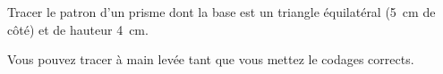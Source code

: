 
\begin{exercice}\label{exo2smath-0319}

    Tracer le patron d'un prisme dont la base est un triangle équilatéral (\SI{5}{\centi\meter} de côté) et de hauteur \SI{4}{\centi\meter}.

    Vous pouvez tracer à main levée tant que vous mettez le codages corrects.

\end{exercice}

